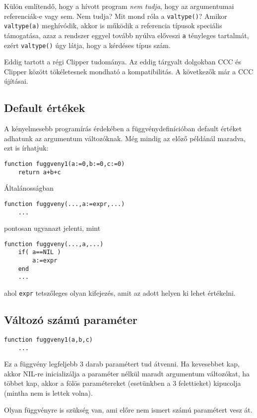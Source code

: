 Külön említendő, hogy a hívott program {\em nem tudja}, hogy az argumentumai
referenciák-e vagy sem. Nem tudja? Mit mond róla a \verb!valtype()!?
Amikor \verb!valtype(a)! meghívódik, akkor is működik a referencia típusok
speciális támogatása, azaz a rendszer eggyel tovább nyúlva előveszi  \verb!a!
tényleges tartalmát, ezért \verb!valtype()! úgy látja, hogy a kérdéses típus szám.

Eddig tartott a régi Clipper tudománya. 
Az eddig tárgyalt dolgokban CCC és Clipper között tökéletesnek mondható a kompatibilitás. 
A következők már a CCC újításai.

\subsection{Default értékek}

A kényelmesebb programírás érdekében a függvénydefinícióban
default értéket adhatunk az argumentum változóknak. Még mindig
az előző példánál maradva, ezt is írhatjuk:

\begin{verbatim}
function fuggveny1(a:=0,b:=0,c:=0)
    return a+b+c
\end{verbatim}

Általánosságban
\begin{verbatim}
function fuggveny(...,a:=expr,...)
    ...
\end{verbatim}
pontosan ugyanazt jelenti, mint
\begin{verbatim}
function fuggveny(...,a,...)
    if( a==NIL )
        a:=expr
    end
    ...
\end{verbatim}
ahol \verb!expr! tetszőleges olyan kifejezés, amit az adott helyen ki lehet
értékelni.



\subsection{Változó számú paraméter}

\begin{verbatim}
function fuggveny1(a,b,c)
    ...
\end{verbatim}
Ez a függvény legfeljebb 3 darab paramétert tud átvenni. 
Ha kevesebbet kap, 
akkor NIL-re inicializálja a paraméter nélkül maradt argumentum változókat, 
ha többet kap, 
akkor a fölös paramétereket (esetünkben a 3 felettieket) kipucolja 
(mintha nem is lettek volna).

Olyan függvényre is szükség van, ami előre nem ismert számú paramétert vesz át.

